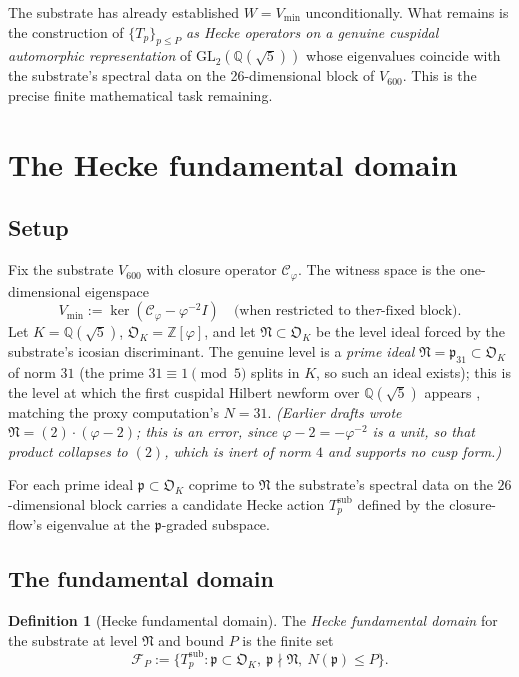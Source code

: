 \documentclass[11pt,a4paper]{article}
\theoremstyle{definition}
\newtheorem{definition}[theorem]{Definition}
\newcommand{\Z}{\mathbb{Z}}
\newcommand{\Q}{\mathbb{Q}}
\newcommand{\Vmin}{V_{\min}}
\newcommand{\Tp}{T_p}
\newcommand{\Cphi}{\mathcal{C}_{\!\varphi}}
\begin{document}
The substrate has already established $W=\Vmin$ unconditionally. What remains
is the construction of $\{T_p\}_{p\le P}$ \emph{as Hecke operators on a genuine
cuspidal automorphic representation} of $\mathrm{GL}_2(\Q(\sqrt{5}))$ whose
eigenvalues coincide with the substrate's spectral data on the 26-dimensional
block of $V_{600}$. This is the precise finite mathematical task remaining.

\section{The Hecke fundamental domain}

\subsection{Setup}
Fix the substrate $V_{600}$ with closure operator $\Cphi$. The witness space is
the one-dimensional eigenspace
$$
\Vmin := \ker(\Cphi - \varphi^{-2} I)\quad\text{(when restricted to the
$\tau$-fixed block)}.
$$
Let $K=\Q(\sqrt{5})$, $\mathfrak{O}_K = \Z[\varphi]$, and let
$\mathfrak{N}\subset\mathfrak{O}_K$ be the level ideal forced by the substrate's
icosian discriminant. The genuine level is a \emph{prime ideal}
$\mathfrak{N}=\mathfrak{p}_{31}\subset\mathfrak{O}_K$ of norm $31$ (the prime
$31\equiv1\pmod 5$ splits in $K$, so such an ideal exists); this is the level
at which the first cuspidal Hilbert newform over $\Q(\sqrt 5)$ appears
\cite{Dembele}, matching the proxy computation's $N=31$.
\emph{(Earlier drafts wrote $\mathfrak{N}=(2)\cdot(\varphi-2)$; this is an
error, since $\varphi-2=-\varphi^{-2}$ is a unit, so that product collapses to
$(2)$, which is inert of norm $4$ and supports no cusp form.)}

For each prime ideal $\mathfrak{p}\subset\mathfrak{O}_K$ coprime to $\mathfrak{N}$
the substrate's spectral data on the $26$-dimensional block carries a candidate
Hecke action $\Tp^{\mathrm{sub}}$ defined by the closure-flow's eigenvalue at
the $\mathfrak{p}$-graded subspace.

\subsection{The fundamental domain}
\begin{definition}[Hecke fundamental domain]\label{def:fund}
The \emph{Hecke fundamental domain} for the substrate at level $\mathfrak{N}$
and bound $P$ is the finite set
$$
\mathcal{F}_P :=
\{\Tp^{\mathrm{sub}} : \mathfrak{p}\subset\mathfrak{O}_K,\ \mathfrak{p}\nmid\mathfrak{N},\ N(\mathfrak{p})\le P\}.
$$
\end{definition}
\end{document}
